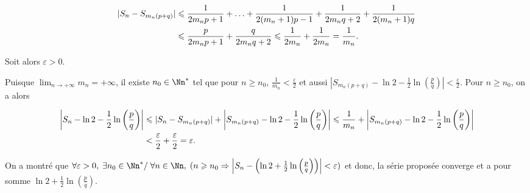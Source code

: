 {{\begin{align*}\ensuremath
|S_n-S_{m_n(p+q)}|&\leqslant\frac{1}{2m_np+1}+\ldots+\frac{1}{2(m_n+1)p-1}+\frac{1}{2m_nq+2}+\frac{1}{2(m_n+1)q}\\
 &\leqslant\frac{p}{2m_np+1}+\frac{q}{2m_nq+2}\leqslant\frac{1}{2m_n}+\frac{1}{2m_n}=\frac{1}{m_n}.
\end{align*}

Soit alors $\varepsilon>0$.

Puisque $\lim_{n \rightarrow +\infty}m_n=+\infty$, il existe $n_0\in\Nn^*$ tel que pour $n\geqslant n_0$, $\frac{1}{m_n}<\frac{\varepsilon}{2}$ et aussi $\left|S_{m_n(p+q)}-\ln2-\frac{1}{2}\ln\left(\frac{p}{q}\right)\right|<\frac{\varepsilon}{2}$. Pour $n\geqslant n_0$, on a alors

\begin{align*}\ensuremath
\left|S_{n}-\ln2 -\frac{1}{2}\ln\left(\frac{p}{q}\right)\right|&\leqslant|S_n-S_{m_n(p+q)}|+\left|S_{m_n(p+q)}-\ln2-\frac{1}{2}\ln\left(\frac{p}{q}\right)\right|\leqslant\frac{1}{m_n}+\left|S_{m_n(p+q)}-\ln2-\frac{1}{2}\ln\left(\frac{p}{q}\right)\right|\\
 &<\frac{\varepsilon}{2}+\frac{\varepsilon}{2}=\varepsilon.
\end{align*}

On a montré que $\forall \varepsilon>0,\;\exists n_0\in\Nn^*/\;\forall n\in\Nn,\;(n\geqslant n_0\Rightarrow\left|S_{n}-\left(\ln2 +\frac{1}{2}\ln\left(\frac{p}{q}\right)\right)\right|<\varepsilon)$ et donc, la série proposée converge et a pour somme $\ln2 +\frac{1}{2}\ln\left(\frac{p}{q}\right)$.
}
}
